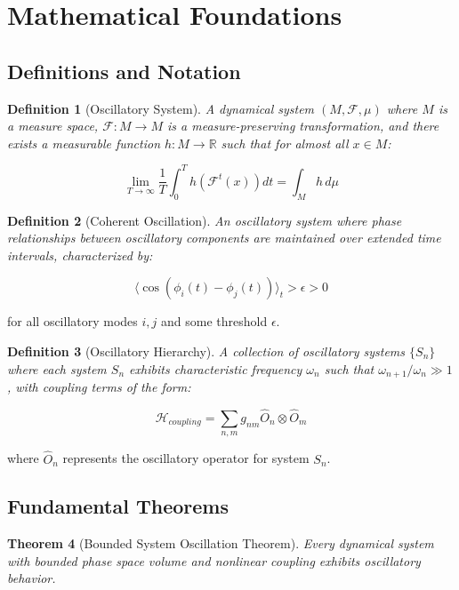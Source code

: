 \documentclass[11pt]{article}
\newtheorem{theorem}{Theorem}[section]
\newtheorem{definition}[theorem]{Definition}
\theoremstyle{remark}
\begin{document}
\section{Mathematical Foundations}

\subsection{Definitions and Notation}

\begin{definition}[Oscillatory System]
A dynamical system $(M, \mathcal{F}, \mu)$ where $M$ is a measure space, $\mathcal{F}: M \to M$ is a measure-preserving transformation, and there exists a measurable function $h: M \to \mathbb{R}$ such that for almost all $x \in M$:
\end{definition}

$$\lim_{T \to \infty} \frac{1}{T}\int_0^T h(\mathcal{F}^t(x)) dt = \int_M h \, d\mu$$

\begin{definition}[Coherent Oscillation]
An oscillatory system where phase relationships between oscillatory components are maintained over extended time intervals, characterized by:
\end{definition}

$$\langle\cos(\phi_i(t) - \phi_j(t))\rangle_t > \epsilon > 0$$

for all oscillatory modes $i, j$ and some threshold $\epsilon$.

\begin{definition}[Oscillatory Hierarchy]
A collection of oscillatory systems $\{S_n\}$ where each system $S_n$ exhibits characteristic frequency $\omega_n$ such that $\omega_{n+1}/\omega_n \gg 1$, with coupling terms of the form:
\end{definition}

$$\mathcal{H}_{coupling} = \sum_{n,m} g_{nm} \hat{O}_n \otimes \hat{O}_m$$

where $\hat{O}_n$ represents the oscillatory operator for system $S_n$.

\subsection{Fundamental Theorems}

\begin{theorem}[Bounded System Oscillation Theorem]
Every dynamical system with bounded phase space volume and nonlinear coupling exhibits oscillatory behavior.
\end{theorem}
\end{document}
